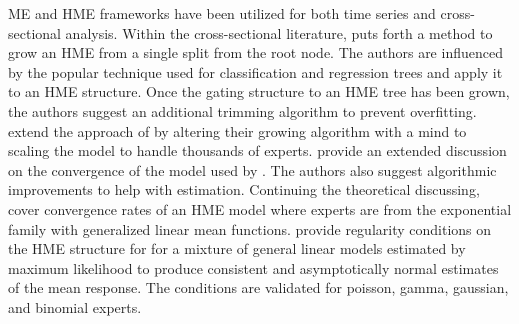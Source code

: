 \documentclass[12pt]{article}
\begin{document}
ME and HME frameworks have been utilized for both time series and
cross-sectional analysis. Within the cross-sectional literature,
\citet{WaterhouseRobinson1995} puts forth a method to grow an HME from a
single split from the root node. The authors are influenced by the popular
technique used for classification and regression trees \citep{CART1984} and 
apply it to an HME structure. Once the gating structure to an HME tree has    
been grown, the authors suggest an additional trimming algorithm to prevent overfitting.
\citet{FFW1997} extend the approach of \citet{WaterhouseRobinson1995} by altering their
growing algorithm with a mind to scaling the model to handle thousands of
experts. \citet{JordanXuConverge1995} provide an extended discussion on the convergence of the
model used by \citet{JordanJacobs1993}. The authors also suggest
algorithmic improvements to help with estimation. Continuing the theoretical
discussing, \citet{JiangTanner1999} cover convergence rates of an HME model where experts
are from the exponential family with generalized linear mean functions.
\citet{JiangTanner2000} provide regularity conditions on the HME structure for
for a mixture of general linear models estimated by maximum likelihood to
produce consistent and asymptotically normal estimates of the mean response.
The conditions are validated for poisson, gamma, gaussian, and binomial experts.

\bigskip
\end{document}
